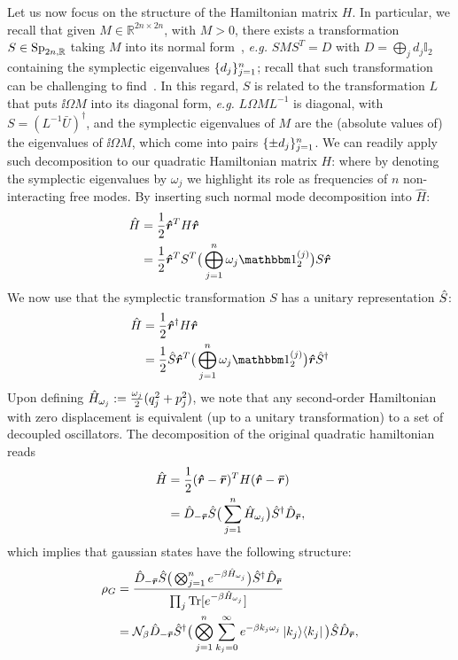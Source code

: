 Let us now focus on the structure of the Hamiltonian matrix $H$. In particular, we recall that given $M\in\mathbb{R}^{2n\times2n}$, with $M>0$, there exists a transformation $S\in\text{Sp}_{2n,\mathbb{R}}$ taking $M$ into its normal form~\cite{Williamson1936Algebraic}, \textit{e.g.} $SMS^T = D$  with $D = \bigoplus_j d_j\mathbb{I}_2$ %
containing the symplectic eigenvalues $\lbrace d_j\rbrace_{j=1}^n$; recall that such transformation can be challenging to find~\cite{pereira2021symplectic, Pirandola2009correlation}. In this regard, $S$ is related to the transformation
$L$ that puts $\ii \Omega M$ into its diagonal form, \textit{e.g.}
$L \Omega M L^{-1}$ is diagonal, with $S = (L^{-1} \bar{U})^\dagger$, and the symplectic eigenvalues of $M$ are the (absolute values of) the eigenvalues of $\ii \Omega M$, which come into pairs $\lbrace \pm d_j\rbrace_{j=1}^n$.
We can readily apply such decomposition to our quadratic Hamiltonian matrix $H$:
where by denoting the symplectic eigenvalues by $\omega_j$ we highlight its role as frequencies of $n$ non-interacting free modes.
By inserting such normal mode decomposition into $\hat{H}$:
\begin{align}
\hat{H} &= \frac{1}{2} \rop^T H \rop \\
&= \frac{1}{2} \rop^T S^T \big(\bigoplus_{j=1}^n \omega_j \id^{(j)}_2 \big)S \rop
\end{align}
We now use that the symplectic transformation $S$ has a unitary representation $\hat{S}$:
\begin{align}
\hat{H} &= \frac{1}{2} \rop^\dagger H \rop \\
&= \frac{1}{2} \hat{S} \rop^T \big(\bigoplus_{j=1}^n \omega_j \id^{(j)}_2 \big) \rop \hat{S}^\dagger
\end{align}
Upon defining $\hat{H}_{\omega_j} := \frac{\omega_j}{2}(q_j^2 + p_j^2)$, we note that any second-order Hamiltonian with zero displacement is equivalent (up to a unitary transformation) to a set of decoupled oscillators. The decomposition of the original quadratic hamiltonian reads
\begin{align}
\hat{H} &= \frac{1}{2} (\bm{\hat{r}} - \bm{\bar{r}})^T H (\bm{\hat{r}} - \bm{\bar{r}}) \\
&= \hat{D}_{-\bm{\bar{r}}} \hat{S} \big( \sum_{j=1}^n \hat{H}_{\omega_j}\big) \hat{S}^\dagger \hat{D}_{\bm{\bar{r}}},
\end{align}
which implies that gaussian states have the following structure:
\begin{align}\label{eq:1gaussrho}
\rho_G &= \frac{\weyl{-\rbar} \hat{S} \big( \bigotimes_{j=1}^n e^{- \beta \hoj} \big) \hat{S}^\dagger \weyl{\rbar} }{ \prod_j\tr{e^{-\beta \hoj} }} \\
&= \mathcal{N}_\beta \weyl{-\rbar} \hat{S}^\dagger \big( \bigotimes_{j=1}^n \sum_{k_j=0}^\infty e^{- \beta k_j \omega_j} \proj{k_j} \big) \hat{S} \weyl{\rbar},
\end{align}
